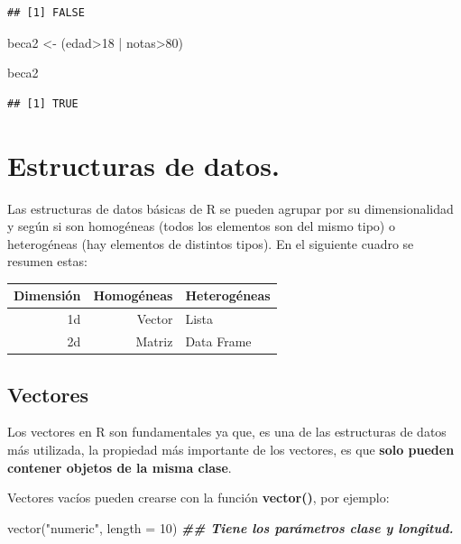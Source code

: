 \documentclass[
  12pt,
]{book}
\newenvironment{Shaded}{\begin{snugshade}}{\end{snugshade}}
\newcommand{\AttributeTok}[1]{\textcolor[rgb]{0.77,0.63,0.00}{#1}}
\newcommand{\DecValTok}[1]{\textcolor[rgb]{0.00,0.00,0.81}{#1}}
\newcommand{\DocumentationTok}[1]{\textcolor[rgb]{0.56,0.35,0.01}{\textbf{\textit{#1}}}}
\newcommand{\FunctionTok}[1]{\textcolor[rgb]{0.00,0.00,0.00}{#1}}
\newcommand{\NormalTok}[1]{#1}
\newcommand{\OtherTok}[1]{\textcolor[rgb]{0.56,0.35,0.01}{#1}}
\newcommand{\SpecialCharTok}[1]{\textcolor[rgb]{0.00,0.00,0.00}{#1}}
\newcommand{\StringTok}[1]{\textcolor[rgb]{0.31,0.60,0.02}{#1}}
\begin{document}
\begin{verbatim}
## [1] FALSE
\end{verbatim}

\begin{Shaded}
\begin{Highlighting}[]
\NormalTok{beca2 }\OtherTok{\textless{}{-}}\NormalTok{ (edad}\SpecialCharTok{\textgreater{}}\DecValTok{18} \SpecialCharTok{|}\NormalTok{ notas}\SpecialCharTok{\textgreater{}}\DecValTok{80}\NormalTok{)}

\NormalTok{beca2}
\end{Highlighting}
\end{Shaded}

\begin{verbatim}
## [1] TRUE
\end{verbatim}

\hypertarget{estructuras-de-datos.}{%
\chapter{\texorpdfstring{\textbf{Estructuras de datos.}}{Estructuras de datos.}}\label{estructuras-de-datos.}}

Las estructuras de datos básicas de R se pueden agrupar por su dimensionalidad y según si son homogéneas (todos los elementos son del mismo tipo) o heterogéneas (hay elementos de distintos tipos). En el siguiente cuadro se resumen estas:

\begin{longtable}[]{@{}rrl@{}}
\toprule
Dimensión & Homogéneas & Heterogéneas\tabularnewline
\midrule
\endhead
1d & Vector & Lista\tabularnewline
2d & Matriz & Data Frame\tabularnewline
\bottomrule
\end{longtable}

\hypertarget{vectores}{%
\section{\texorpdfstring{\textbf{Vectores}}{Vectores}}\label{vectores}}

Los vectores en R son fundamentales ya que, es una de las estructuras de datos más utilizada, la propiedad más importante de los vectores, es que \textbf{solo pueden contener objetos de la misma clase}.

Vectores vacíos pueden crearse con la función \textbf{vector()}, por ejemplo:

\begin{Shaded}
\begin{Highlighting}[]
\FunctionTok{vector}\NormalTok{(}\StringTok{"numeric"}\NormalTok{, }\AttributeTok{length =} \DecValTok{10}\NormalTok{) }\DocumentationTok{\#\# Tiene los parámetros clase y longitud.}
\end{Highlighting}
\end{Shaded}
\end{document}
